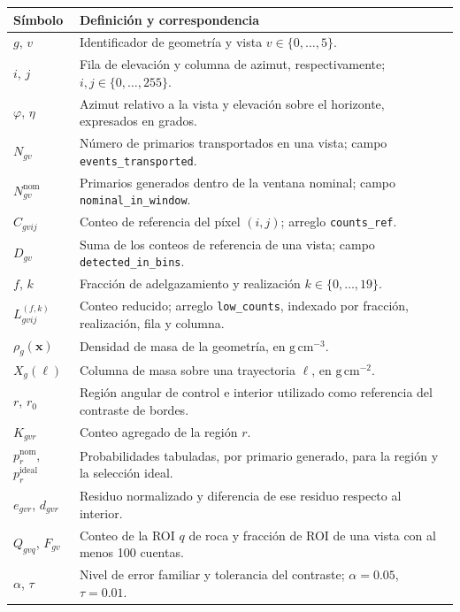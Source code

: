 \documentclass[11pt,a4paper]{article}
\begin{document}
\begin{longtable}{p{}p{}}
\toprule Símbolo & Definición y correspondencia \\ \midrule
\endhead
$g$, $v$ & Identificador de geometría y vista $v\in\{0,\ldots,5\}$. \\
$i$, $j$ & Fila de elevación y columna de azimut, respectivamente; $i,j\in\{0,\ldots,255\}$. \\
$\varphi$, $\eta$ & Azimut relativo a la vista y elevación sobre el horizonte, expresados en grados. \\
$N_{gv}$ & Número de primarios transportados en una vista; campo \texttt{events\_transported}. \\
$N^{\mathrm{nom}}_{gv}$ & Primarios generados dentro de la ventana nominal; campo \texttt{nominal\_in\_window}. \\
$C_{gvij}$ & Conteo de referencia del píxel $(i,j)$; arreglo \texttt{counts\_ref}. \\
$D_{gv}$ & Suma de los conteos de referencia de una vista; campo \texttt{detected\_in\_bins}. \\
$f$, $k$ & Fracción de adelgazamiento y realización $k\in\{0,\ldots,19\}$. \\
$L^{(f,k)}_{gvij}$ & Conteo reducido; arreglo \texttt{low\_counts}, indexado por fracción, realización, fila y columna. \\
$\rho_g(\boldsymbol{x})$ & Densidad de masa de la geometría, en $\mathrm{g\,cm^{-3}}$. \\
$X_g(\ell)$ & Columna de masa sobre una trayectoria $\ell$, en $\mathrm{g\,cm^{-2}}$. \\
$r$, $r_0$ & Región angular de control e interior utilizado como referencia del contraste de bordes. \\
$K_{gvr}$ & Conteo agregado de la región $r$. \\
$p^{\mathrm{nom}}_r$, $p^{\mathrm{ideal}}_r$ & Probabilidades tabuladas, por primario generado, para la región y la selección ideal. \\
$e_{gvr}$, $d_{gvr}$ & Residuo normalizado y diferencia de ese residuo respecto al interior. \\
$Q_{gvq}$, $F_{gv}$ & Conteo de la ROI $q$ de roca y fracción de ROI de una vista con al menos 100 cuentas. \\
$\alpha$, $\tau$ & Nivel de error familiar y tolerancia del contraste; $\alpha=0.05$, $\tau=0.01$. \\
\bottomrule
\end{longtable}
\end{document}
